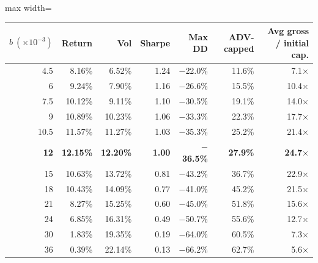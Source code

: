 {\small
\begin{adjustbox}{max width=\linewidth}
\begin{tabular}{rrrrrrr}
\toprule
$b\ (\times10^{-3})$ & Return & Vol & Sharpe & Max DD & ADV-capped & Avg gross / initial cap. \\
\midrule
4.5 & 8.16\% & 6.52\% & 1.24 & $-$22.0\% & 11.6\% & 7.1$\times$ \\
6 & 9.24\% & 7.90\% & 1.16 & $-$26.6\% & 15.5\% & 10.4$\times$ \\
7.5 & 10.12\% & 9.11\% & 1.10 & $-$30.5\% & 19.1\% & 14.0$\times$ \\
9 & 10.89\% & 10.23\% & 1.06 & $-$33.3\% & 22.3\% & 17.7$\times$ \\
10.5 & 11.57\% & 11.27\% & 1.03 & $-$35.3\% & 25.2\% & 21.4$\times$ \\
\textbf{12} & \textbf{12.15\%} & \textbf{12.20\%} & \textbf{1.00} & \textbf{$-$36.5\%} & \textbf{27.9\%} & \textbf{24.7$\times$} \\
15 & 10.63\% & 13.72\% & 0.81 & $-$43.2\% & 36.7\% & 22.9$\times$ \\
18 & 10.43\% & 14.09\% & 0.77 & $-$41.0\% & 45.2\% & 21.5$\times$ \\
21 & 8.27\% & 15.25\% & 0.60 & $-$45.0\% & 51.8\% & 15.6$\times$ \\
24 & 6.85\% & 16.31\% & 0.49 & $-$50.7\% & 55.6\% & 12.7$\times$ \\
30 & 1.83\% & 19.35\% & 0.19 & $-$64.0\% & 60.5\% & 7.3$\times$ \\
36 & 0.39\% & 22.14\% & 0.13 & $-$66.2\% & 62.7\% & 5.6$\times$ \\
\bottomrule
\end{tabular}
\end{adjustbox}
}
